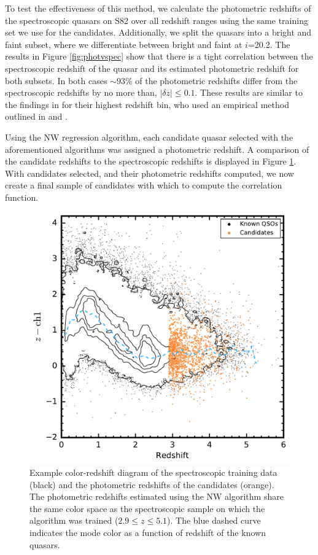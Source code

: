 \documentclass[apj, numberedappendix]{emulateapj}
\begin{document}
To test the effectiveness of this method, we calculate the photometric redshifts of the spectroscopic quasars on S82 over all redshift ranges using the same training set we use for the candidates. Additionally, we split the quasars into a bright and faint subset, where we differentiate between bright and faint at $i$=20.2. The results in Figure \ref{fig:photvspec} show that there is a tight correlation between the spectroscopic redshift of the quasar and its estimated photometric redshift for both subsets. In both cases $\sim 93\%$ of the photometric redshifts differ from the spectroscopic redshifts by no more than, $\vert \delta z \vert \leq 0.1$. These results are similar to the findings in \citet{Richards2015} for their highest redshift bin, who used an empirical method outlined in \citet{Richards2001} and \citet{Weinstein2004}. 

Using the NW regression algorithm, each candidate quasar selected with the aforementioned algorithms was assigned a photometric redshift. A comparison of the candidate redshifts to the spectroscopic redshifts is displayed in Figure \ref{fig:colzspecsing}. With candidates selected, and their photometric redshifts computed, we now create a final sample of candidates with which to compute the correlation function.

\begin{figure}[h!]
 \centering
 \includegraphics[scale=0.45]{./New_Plots/col_specz_single.pdf}
 \caption{\footnotesize{Example color-redshift diagram of the spectroscopic training data (black) and the photometric redshifts of the candidates (orange). The photometric redshifts estimated using the NW algorithm share the same color space as the spectroscopic sample on which the algorithm was trained ($2.9 \leq z \leq 5.1$). The blue dashed curve indicates the mode color as a function of redshift of the known quasars.}}
 \label{fig:colzspecsing}
 \end{figure}
 
\end{document}
